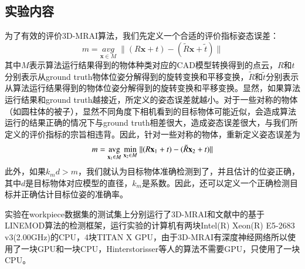 \subsection{实验内容}
为了有效的评价3D-MRAI算法，我们先定义一个合适的评价指标{\kai 姿态误差}：
\begin{equation}
  m = {\underset{\mathbf{x}\in M}{avg}} \; {\parallel (R\mathbf{x}+t) - (\tilde{R}\mathbf{x}+\tilde{t})\parallel}
\end{equation}
其中$M$表示算法运行结果得到的物体种类对应的CAD模型转换得到的点云，$R$和$t$分别表示从ground truth物体位姿分解得到的旋转变换和平移变换，$\tilde{R}$和$\tilde{t}$分别表示从算法运行结果得到的物体位姿分解得到的旋转变换和平移变换。显然，如果算法运行结果和ground truth越接近，所定义的姿态误差就越小。对于一些对称的物体（如圆柱体的被子），显然不同角度下相机看到的目标物体可能近似，会造成算法运行的结果正确的情况下与ground truth相差很大，造成姿态误差很大，与我们所定义的评价指标的宗旨相违背。因此，针对一些对称的物体，重新定义姿态误差为
\begin{equation}
  m = {\operatorname*{avg}_{\mathbf{x}_1\in M}} \; {\min_{\mathbf{x}_2\in M}} \; \lVert(R\mathbf{x}_1+t) - (\tilde{R}\mathbf{x}_2+t)\rVert
\end{equation}
此外，如果$k_md>m$，我们就认为目标物体准确检测到了，并且估计的位姿正确，其中$d$是目标物体对应模型的直径，$k_m$是系数。因此，还可以定义一个正确检测目标并正确估计目标位姿的准确率。

实验在workpiece数据集的测试集上分别运行了3D-MRAI和文献\cite{hinterstoisser2012model}中的基于LINEMOD算法的检测框架，运行实验的计算机有两块Intel(R) Xeon(R) E5-2683 v3(2.00GHz)的CPU，4块TITAN X GPU，由于3D-MRAI有深度神经网络所以使用了一块GPU和一块CPU，Hinterstorisser等人的算法不需要GPU，只使用了一块CPU。

